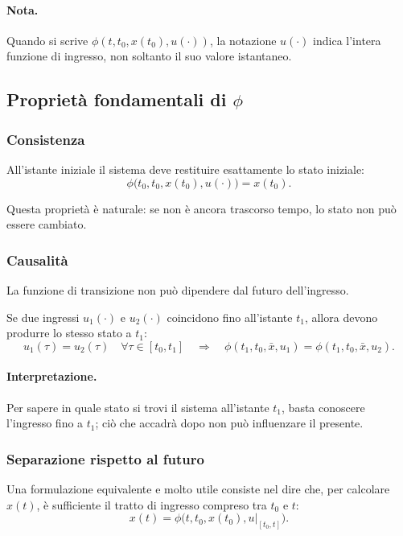 \paragraph{Nota.}
Quando si scrive $\phi(t,t_0,x(t_0),u(\cdot))$, la notazione $u(\cdot)$ indica l'intera funzione di ingresso, non soltanto il suo valore istantaneo.

\subsection{Proprietà fondamentali di \texorpdfstring{$\phi$}{phi}}

\subsubsection{Consistenza}

All'istante iniziale il sistema deve restituire esattamente lo stato iniziale:
\[
\phi\bigl(t_0,t_0,x(t_0),u(\cdot)\bigr)=x(t_0).
\]

Questa proprietà è naturale: se non è ancora trascorso tempo, lo stato non può essere cambiato.

\subsubsection{Causalità}

La funzione di transizione non può dipendere dal futuro dell'ingresso.

Se due ingressi $u_1(\cdot)$ e $u_2(\cdot)$ coincidono fino all'istante $t_1$, allora devono produrre lo stesso stato a $t_1$:
\[
u_1(\tau)=u_2(\tau)\quad \forall \tau\in [t_0,t_1]
\quad \Longrightarrow \quad
\phi(t_1,t_0,\bar x,u_1)=\phi(t_1,t_0,\bar x,u_2).
\]

\paragraph{Interpretazione.}
Per sapere in quale stato si trovi il sistema all'istante $t_1$, basta conoscere l'ingresso fino a $t_1$; ciò che accadrà dopo non può influenzare il presente.

\subsubsection{Separazione rispetto al futuro}

Una formulazione equivalente e molto utile consiste nel dire che, per calcolare $x(t)$, è sufficiente il tratto di ingresso compreso tra $t_0$ e $t$:
\[
x(t)=\phi\bigl(t,t_0,x(t_0),u|_{[t_0,t]}\bigr).
\]

